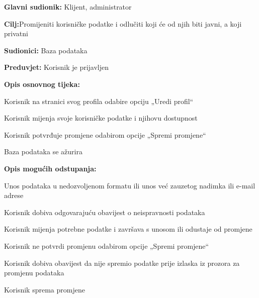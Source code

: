 						\begin{packed_item}
							
							\item \textbf{Glavni sudionik: }Klijent, administrator
							\item  \textbf{Cilj:}Promijeniti korisničke podatke i odlučiti koji će od njih biti javni, a koji privatni
							\item  \textbf{Sudionici:} Baza podataka
							\item  \textbf{Preduvjet:} Korisnik je prijavljen
							\item  \textbf{Opis osnovnog tijeka:}
							
							\item[] \begin{packed_enum}
								
								\item Korisnik na stranici svog profila odabire opciju „Uredi profil“
								\item Korisnik mijenja svoje korisničke podatke i njihovu dostupnost
								\item Korisnik potvrđuje promjene odabirom opcije „Spremi promjene“ 
								\item Baza podataka se ažurira 
								
								
							\end{packed_enum}
							
							\item  \textbf{Opis mogućih odstupanja:}
							
							\item[] \begin{packed_item}
								
								\item[2.a] Unos podataka u nedozvoljenom formatu ili unos već zauzetog nadimka ili e-mail adrese 
								\item[] \begin{packed_enum}
									
									\item Korisnik dobiva odgovarajuću obavijest o neispravnosti podataka 
									\item Korisnik mijenja potrebne podatke i završava s unosom ili odustaje od promjene 
									
								\end{packed_enum}
								\item[3.a] Korisnik ne potvrdi promjenu odabirom opcije „Spremi promjene“    
								\item[] \begin{packed_enum}
									
									\item Korisnik dobiva obavijest da nije spremio podatke prije izlaska iz prozora za promjenu podataka   
									\item Korisnik sprema promjene 
									
								\end{packed_enum}
								
								
								
							\end{packed_item}
						\end{packed_item}
